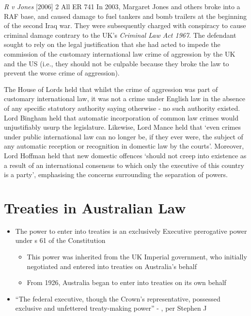 \begin{casedetails}{\textit{R v Jones} [2006] 2 All ER 741}\label{case: R v Jones}
    \flushleft
    In 2003, Margaret Jones and others broke into a RAF base, and caused damage to fuel tankers and bomb trailers at the beginning of the second Iraq war. They were subsequently charged with conspiracy to cause criminal damage contrary to the UK's \textit{Criminal Law Act 1967}. The defendant sought to rely on the legal justification that she had acted to impede the commission of the customary international law crime of aggression by the UK and the US (i.e., they should not be culpable because they broke the law to prevent the worse crime of aggression).

    \vspace{\baselineskip}

    The House of Lords held that whilst the crime of aggression was part of customary international law, it was not a crime under English law in the absence of any specific statutory authority saying otherwise - no such authority existed. Lord Bingham held that automatic incorporation of common law crimes would unjustifiably usurp the legislature. Likewise, Lord Mance held that `even crimes under public international law can no longer be, if they ever were, the subject of any automatic reception or recognition in domestic law by the courts'. Moreover, Lord Hoffman held that new domestic offences `should not creep into existence as a result of an international consensus to which only the executive of this country is a party', emphasising the concerns surrounding the separation of powers.
\end{casedetails}

\section{Treaties in Australian Law}
\begin{itemize}
    \item The power to enter into treaties is an exclusively Executive prerogative power under s 61 of the Constitution
    \begin{itemize}
        \item This power was inherited from the UK Imperial government, who initially negotiated and entered into treaties on Australia's behalf
        \item From 1926, Australia began to enter into treaties on its own behalf
    \end{itemize}
    \item ``The federal executive, though the Crown's representative, possessed exclusive and unfettered treaty-making power'' - , per Stephen J
\end{itemize}

